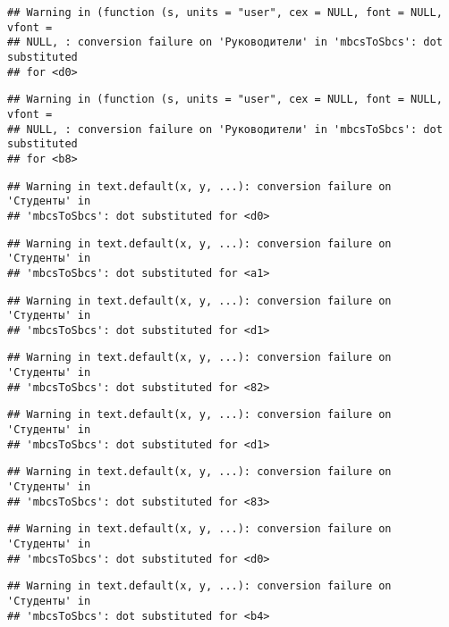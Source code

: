 \documentclass[
]{article}
\begin{document}
\begin{verbatim}
## Warning in (function (s, units = "user", cex = NULL, font = NULL, vfont =
## NULL, : conversion failure on 'Руководители' in 'mbcsToSbcs': dot substituted
## for <d0>
\end{verbatim}

\begin{verbatim}
## Warning in (function (s, units = "user", cex = NULL, font = NULL, vfont =
## NULL, : conversion failure on 'Руководители' in 'mbcsToSbcs': dot substituted
## for <b8>
\end{verbatim}

\begin{verbatim}
## Warning in text.default(x, y, ...): conversion failure on 'Студенты' in
## 'mbcsToSbcs': dot substituted for <d0>
\end{verbatim}

\begin{verbatim}
## Warning in text.default(x, y, ...): conversion failure on 'Студенты' in
## 'mbcsToSbcs': dot substituted for <a1>
\end{verbatim}

\begin{verbatim}
## Warning in text.default(x, y, ...): conversion failure on 'Студенты' in
## 'mbcsToSbcs': dot substituted for <d1>
\end{verbatim}

\begin{verbatim}
## Warning in text.default(x, y, ...): conversion failure on 'Студенты' in
## 'mbcsToSbcs': dot substituted for <82>
\end{verbatim}

\begin{verbatim}
## Warning in text.default(x, y, ...): conversion failure on 'Студенты' in
## 'mbcsToSbcs': dot substituted for <d1>
\end{verbatim}

\begin{verbatim}
## Warning in text.default(x, y, ...): conversion failure on 'Студенты' in
## 'mbcsToSbcs': dot substituted for <83>
\end{verbatim}

\begin{verbatim}
## Warning in text.default(x, y, ...): conversion failure on 'Студенты' in
## 'mbcsToSbcs': dot substituted for <d0>
\end{verbatim}

\begin{verbatim}
## Warning in text.default(x, y, ...): conversion failure on 'Студенты' in
## 'mbcsToSbcs': dot substituted for <b4>
\end{verbatim}
\end{document}
